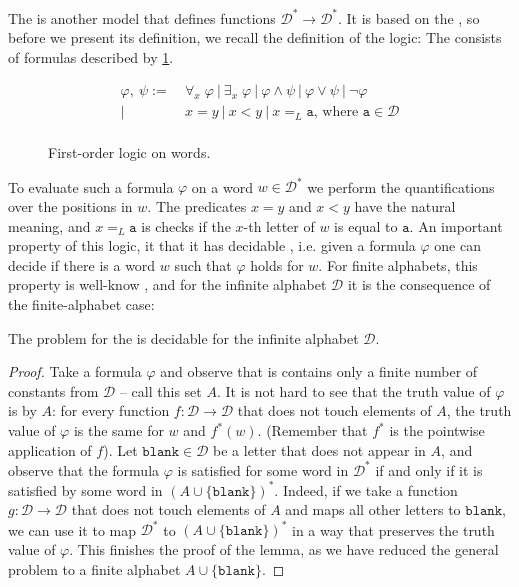\AP The  is another model 
that defines functions $\mathcal{D}^* \to \mathcal{D}^*$. It is based on the ,
so before we present its definition, we recall the definition of the logic: The 
consists of formulas described by \cref{fig:fo-syntax}.
\begin{figure}[h]
    \centering
    \begin{align*}
        \varphi,\ \psi :=&~ \forall_x\; \varphi ~|~ \exists_x\; \varphi ~|~ \varphi \wedge \psi ~|~ \varphi \vee \psi ~|~ \neg \varphi \\
                |&~ x = y ~|~ x < y ~|~ x =_L \mathtt{a} \textrm{, where } \mathtt{a} \in \mathcal{D} \\
    \end{align*}
    \caption{First-order logic on words.}
    \label{fig:fo-syntax}
\end{figure}
To evaluate such a formula $\varphi$ on a word $w \in \mathcal{D}^*$ we perform the quantifications
over the positions in $w$. The predicates $x = y$ and $x < y$ have the natural 
meaning, and $x =_L \mathtt{a}$ is checks if the $x$-th letter of $w$ is equal to $\mathtt{a}$.
An important property of this logic, it that it has decidable , i.e. given a formula
$\varphi$ one can decide if there is a word $w$ such that $\varphi$ holds for $w$. For finite alphabets,
this property is well-know \cite{buchi1960weak}, and for the infinite alphabet $\mathcal{D}$ it is 
the consequence of the finite-alphabet case:
\begin{lemma}
    \label{lem:fo-emptiness}
    The  problem for the  is decidable for the infinite alphabet $\mathcal{D}$.
\end{lemma}
\begin{proof}
    Take a formula $\varphi$ and observe that is contains only a finite number of constants from $\mathcal{D}$ -- call this set $A$.
    It is not hard to see that the truth value of $\varphi$ is  by $A$: for every function $f : \mathcal{D} \to \mathcal{D}$
    that does not touch 
    elements of $A$, the truth value of $\varphi$ is the same for $w$ and $f^*(w)$. (Remember that 
    $f^*$ is the pointwise application of $f$). 
    Let $\mathtt{blank} \in \mathcal{D}$ be a letter that does not appear in $A$,
    and observe that the formula $\varphi$ is satisfied for some word in $\mathcal{D}^*$ if and only if it is satisfied by
    some word in $(A \cup \{\mathtt{blank}\})^*$. Indeed, if we take a function $g: \mathcal{D} \to \mathcal{D}$ that does not touch elements of $A$
    and maps all other letters to $\mathtt{blank}$, we can use it to map $\mathcal{D}^*$ to $(A \cup \{\mathtt{blank}\})^*$ in a way 
    that preserves the truth value of $\varphi$.
    This finishes the proof of the lemma, as we have reduced the general problem to a finite alphabet $A \cup \{\mathtt{blank}\}$.
\end{proof}

